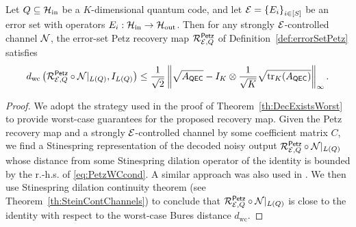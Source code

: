 \documentclass[10pt]{article}
\newcommand{\SIN}{\mathrm{in}}
\newcommand{\SOUT}{\mathrm{out}}
\newcommand{\tr}{\mathrm{tr}}
\newcommand{\p}[1]{\left(#1\right)}
\newcommand{\ppp}[1]{\left\{#1\right\}}
\newcommand{\norm}[1]{\left\|#1\right\|}
\newcommand{\s}[1]{\mathsf{#1}}
\begin{document}
\begin{theorem}\label{th:WCpetz}
     Let $Q\subseteq\calH_{\SIN}$ be a $K$-dimensional quantum code, and let $\calE=\ppp{E_i}_{i\in[S]}$ be an error set with operators $E_i:\calH_{\SIN}\to\calH_{\SOUT}$. Then  for any strongly ${\cal E}$-controlled channel ${\cal N}$, the error-set Petz recovery map $\calR_{\calE,Q}^{\s{Petz}}$ of Definition~\ref{def:errorSetPetz} satisfies 
     \begin{equation}
         d_{\mathrm{wc}}\p{\calR_{\calE,Q}^{\s{\s{Petz}}}\circ \calN|_{L(Q)},I_{L(Q)}}\leq \frac{1}{\sqrt{2}}\norm{\sqrt{A_{\s{QEC}}}-I_{K}\otimes \frac{1}{\sqrt{K}}\sqrt{\tr_K(A_{\s{QEC}})}}_{\infty}.\label{eq:PetzWCcond}
     \end{equation}
 \end{theorem}
\begin{proof}
    We adopt the strategy used in the proof of Theorem~\ref{th:DecExistsWorst} to provide worst-case guarantees for the proposed recovery map. Given the Petz recovery map and a strongly ${\cal E}$-controlled channel by some 
    coefficient matrix $C$, we find a Stinespring representation of the decoded noisy output $\calR_{\calE,Q}^{\s{Petz}}\circ \calN|_{L(Q)}$ whose distance from some Stinespring dilation operator of the identity is bounded by the r.-h.s.
        of \eqref{eq:PetzWCcond}. A similar approach was also used in \cite{ma2025haar}. We then use Stinespring dilation continuity theorem (see Theorem~\ref{th:SteinContChannels}) to conclude that $\calR_{\calE,Q}^{\s{Petz}}\circ \calN|_{L(Q)}$ is close to the identity with respect to the worst-case Bures distance $d_{\mathrm{wc}}$. 


\end{proof}
\end{document}
